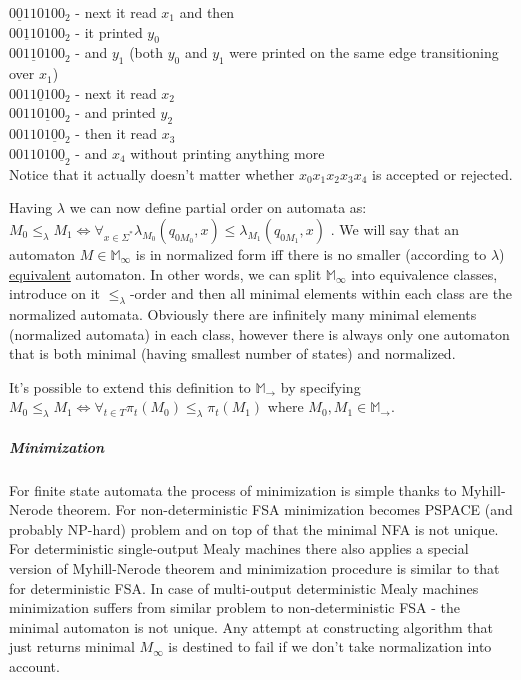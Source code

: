 \documentclass[12pt]{article}
\begin{document}
$0\underline{0}110100_2$ - next it read $x_1$ and then \\
$00\underline{1}10100_2$ - it printed $y_0$ \\
$001\underline{1}0100_2$ - and $y_1$ (both $y_0$ and $y_1$ were printed on the same edge transitioning over $x_1$)\\
$0011\underline{0}100_2$ - next it read $x_2$\\
$00110\underline{1}00_2$ - and printed $y_2$ \\
$001101\underline{0}0_2$ - then it read $x_3$ \\
$0011010\underline{0}_2$ - and $x_4$ without printing anything more \\
Notice that it actually doesn't matter whether $x_0x_1x_2x_3x_4$ is accepted or rejected. 

Having $\lambda$ we can now define partial order on automata as: \\ 
$M_0 \le_{\lambda} M_1 \iff \forall_{x\in\Sigma^*} \lambda_{M_0}(q_{0M_0},x) \le \lambda_{M_1}(q_{0M_1},x)$ . We will say that an automaton $M\in\mathbb{M}_\infty$ is in normalized form iff there is no smaller (according to $\lambda$) \underline{equivalent} automaton. In other words, we can split $\mathbb{ M}_\infty$ into equivalence classes, introduce on it $\le_\lambda$-order and then all minimal elements within each class are the normalized automata. Obviously there are infinitely many minimal elements (normalized automata) in each class, however there is always  only one automaton that is both minimal (having smallest number of states) and normalized.

It's possible to extend this definition to $\mathbb{ M}_\rightarrow$ by specifying \\ $M_0 \le_{\lambda} M_1  \iff \forall_{t\in T} \pi_t(M_0) \le_{\lambda} \pi_t(M_1)$ where $M_0,M_1\in \mathbb{ M}_\rightarrow$.



\subparagraph{Minimization} For finite state automata the process of minimization is simple thanks to Myhill-Nerode theorem. For non-deterministic FSA minimization becomes PSPACE (and probably NP-hard) problem and on top of that the minimal NFA is not unique. For deterministic single-output Mealy machines there also applies a special version of Myhill-Nerode theorem and minimization procedure is similar to that for deterministic FSA. In case of multi-output deterministic Mealy machines minimization suffers from similar problem to non-deterministic FSA - the minimal automaton is not unique. Any attempt at constructing algorithm that just returns minimal $M_\infty$ is destined to fail if we don't take normalization into account. 
\end{document}
